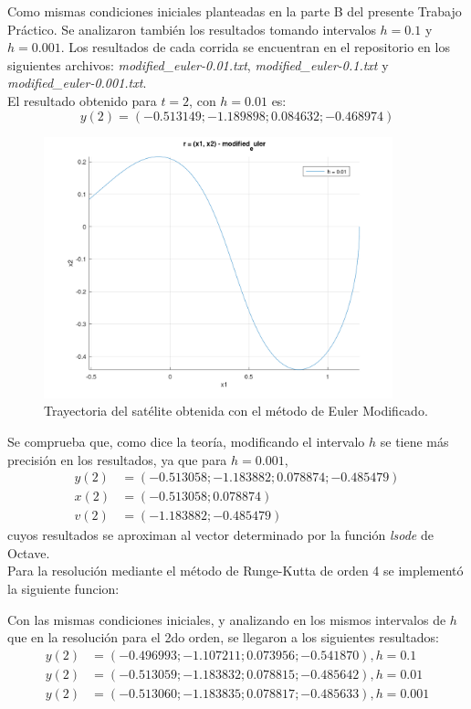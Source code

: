 \documentclass[titlepage,a4paper]{article}
\begin{document}
	Como mismas condiciones iniciales planteadas en la parte B del presente Trabajo Práctico. Se analizaron también los resultados tomando intervalos $ h = 0.1 $ y $ h = 0.001 $. Los resultados de cada corrida se encuentran en el repositorio en los siguientes archivos: \emph{modified\_euler-0.01.txt}, \emph{modified\_euler-0.1.txt} y \emph{modified\_euler-0.001.txt}.\\ 
	El resultado obtenido para $ t = 2 $, con $ h = 0.01 $ es:
	\begin{equation}
		y(2) = (-0.513149; -1.189898; 0.084632; -0.468974)
	\end{equation}
	\begin{figure}[H]
		\centering
		\includegraphics[width=0.9\textwidth]{modified_euler.png}
		\caption{\label{fig:parted}Trayectoria del satélite obtenida con el método de Euler Modificado.}
	\end{figure}
	Se comprueba que, como dice la teoría, modificando el intervalo $ h $ se tiene más precisión en los resultados, ya que para $ h = 0.001 $,
	\begin{align*}
		y(2) &= (-0.513058; -1.183882; 0.078874; -0.485479)\\
		x(2) &= (-0.513058; 0.078874)\\
		v(2) &= (-1.183882; -0.485479)
	\end{align*}
	cuyos resultados se aproximan al vector determinado por la función \emph{lsode} de Octave.\\

	Para la resolución mediante el método de Runge-Kutta de orden 4 se implementó la siguiente funcion:
	

	Con las mismas condiciones iniciales, y analizando en los mismos intervalos de $ h $ que en la resolución para el 2do orden, se llegaron a los siguientes resultados:
	\begin{align*}
		y(2) &= (-0.496993; -1.107211; 0.073956; -0.541870), h = 0.1\\
		y(2) &= (-0.513059; -1.183832; 0.078815; -0.485642), h = 0.01\\
		y(2) &= (-0.513060; -1.183835; 0.078817; -0.485633), h = 0.001
	\end{align*}
\end{document}
